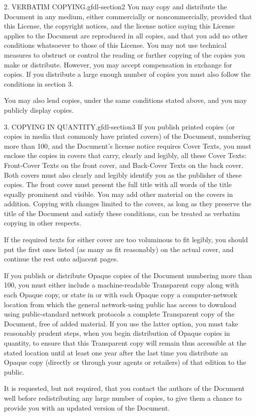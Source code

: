 \documentclass[10pt,]{book}
\numberwithin{equation}{section}
\begin{document}
\begin{paragraphs}{2. VERBATIM COPYING.}{gfdl-section2}%
\hypertarget{p-1540}{}%
You may copy and distribute the Document in any medium, either commercially or noncommercially, provided that this License, the copyright notices, and the license notice saying this License applies to the Document are reproduced in all copies, and that you add no other conditions whatsoever to those of this License. You may not use technical measures to obstruct or control the reading or further copying of the copies you make or distribute. However, you may accept compensation in exchange for copies. If you distribute a large enough number of copies you must also follow the conditions in section 3.%
\par
\hypertarget{p-1541}{}%
You may also lend copies, under the same conditions stated above, and you may publicly display copies.%
\end{paragraphs}%
\begin{paragraphs}{3. COPYING IN QUANTITY.}{gfdl-section3}%
\hypertarget{p-1542}{}%
If you publish printed copies (or copies in media that commonly have printed covers) of the Document, numbering more than 100, and the Document's license notice requires Cover Texts, you must enclose the copies in covers that carry, clearly and legibly, all these Cover Texts: Front-Cover Texts on the front cover, and Back-Cover Texts on the back cover. Both covers must also clearly and legibly identify you as the publisher of these copies. The front cover must present the full title with all words of the title equally prominent and visible. You may add other material on the covers in addition. Copying with changes limited to the covers, as long as they preserve the title of the Document and satisfy these conditions, can be treated as verbatim copying in other respects.%
\par
\hypertarget{p-1543}{}%
If the required texts for either cover are too voluminous to fit legibly, you should put the first ones listed (as many as fit reasonably) on the actual cover, and continue the rest onto adjacent pages.%
\par
\hypertarget{p-1544}{}%
If you publish or distribute Opaque copies of the Document numbering more than 100, you must either include a machine-readable Transparent copy along with each Opaque copy, or state in or with each Opaque copy a computer-network location from which the general network-using public has access to download using public-standard network protocols a complete Transparent copy of the Document, free of added material. If you use the latter option, you must take reasonably prudent steps, when you begin distribution of Opaque copies in quantity, to ensure that this Transparent copy will remain thus accessible at the stated location until at least one year after the last time you distribute an Opaque copy (directly or through your agents or retailers) of that edition to the public.%
\par
\hypertarget{p-1545}{}%
It is requested, but not required, that you contact the authors of the Document well before redistributing any large number of copies, to give them a chance to provide you with an updated version of the Document.%
\end{paragraphs}%
\end{document}
